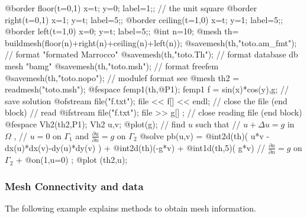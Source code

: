 \documentclass[a4paper,twoside,12pt]{book}
\def\p{\partial}
\begin{document}
\eFF

\begin{example}
\bFF

@border floor(t=0,1){ x=t; y=0; label=1;}; // the unit square
@border right(t=0,1){ x=1; y=t; label=5;};
@border ceiling(t=1,0){ x=t; y=1; label=5;};
@border left(t=1,0){ x=0; y=t; label=5;};
@int n=10;
@mesh th= buildmesh(floor(n)+right(n)+ceiling(n)+left(n));
@savemesh(th,"toto.am_fmt");  // format "formated Marrocco" 
@savemesh(th,"toto.Th");      // format database  db mesh "bamg"   
@savemesh(th,"toto.msh");     // format freefem 
@savemesh(th,"toto.nopo");     // modulef format  see \cite{modulef}
@mesh th2 = readmesh("toto.msh");
@fespace femp1(th,@P1);
femp1 f = sin(x)*cos(y),g;
{ // save solution
@ofstream file("f.txt");
file << f[] << endl;
}  // close the file (end block)
{  // read
@ifstream file("f.txt");
file >> g[] ;
} // close reading file (end block)
@fespace Vh2(th2,P1);
Vh2 u,v;
@plot(g);
//  find $u$ such that \hfilll
// $ u + \Delta u = g $ in $\Omega $ , \hfilll
// $ u=0$ on $\Gamma_1$ and $\frac{\p u }{\p n} = g$ on $\Gamma_2$  \hfilll
@solve pb(u,v) =
    @int2d(th)( u*v - dx(u)*dx(v)-dy(u)*dy(v) )
  + @int2d(th)(-g*v)
  + @int1d(th,5)( g*v) //  $\frac{\p u }{\p n} = g$ on $\Gamma_2$
  + @on(1,u=0) ;
@plot (th2,u);
\eFF
\end{example}

\subsubsection{Mesh Connectivity and data}

The following example explains methods to obtain mesh information.
\end{document}
